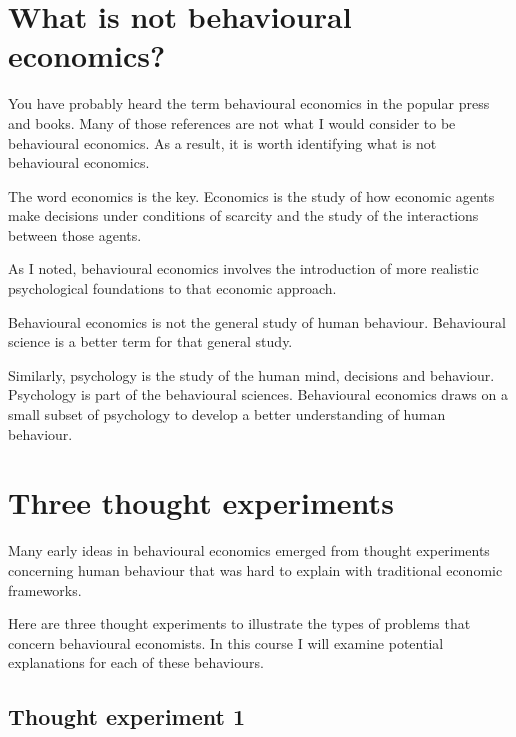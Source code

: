 \documentclass[
  letterpaper,
  DIV=11,
  numbers=noendperiod]{scrreprt}
\begin{document}
\hypertarget{what-is-not-behavioural-economics}{%
\section*{What is not behavioural
economics?}\label{what-is-not-behavioural-economics}}


You have probably heard the term behavioural economics in the popular
press and books. Many of those references are not what I would consider
to be behavioural economics. As a result, it is worth identifying what
is not behavioural economics.

The word economics is the key. Economics is the study of how economic
agents make decisions under conditions of scarcity and the study of the
interactions between those agents.

As I noted, behavioural economics involves the introduction of more
realistic psychological foundations to that economic approach.

Behavioural economics is not the general study of human behaviour.
Behavioural science is a better term for that general study.

Similarly, psychology is the study of the human mind, decisions and
behaviour. Psychology is part of the behavioural sciences. Behavioural
economics draws on a small subset of psychology to develop a better
understanding of human behaviour.

\hypertarget{three-thought-experiments}{%
\section*{Three thought experiments}\label{three-thought-experiments}}


Many early ideas in behavioural economics emerged from thought
experiments concerning human behaviour that was hard to explain with
traditional economic frameworks.

Here are three thought experiments to illustrate the types of problems
that concern behavioural economists. In this course I will examine
potential explanations for each of these behaviours.

\hypertarget{thought-experiment-1}{%
\subsection*{Thought experiment 1}\label{thought-experiment-1}}
\end{document}

